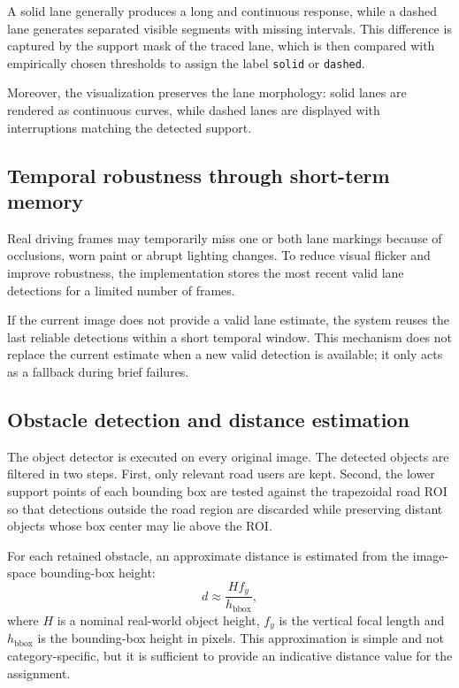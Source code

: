 \documentclass[conference]{IEEEtran}
\begin{document}
A solid lane generally produces a long and continuous response, while a dashed lane generates separated visible segments with missing intervals. This difference is captured by the support mask of the traced lane, which is then compared with empirically chosen thresholds to assign the label \texttt{solid} or \texttt{dashed}.

Moreover, the visualization preserves the lane morphology: solid lanes are rendered as continuous curves, while dashed lanes are displayed with interruptions matching the detected support.

\subsection{Temporal robustness through short-term memory}
Real driving frames may temporarily miss one or both lane markings because of occlusions, worn paint or abrupt lighting changes. To reduce visual flicker and improve robustness, the implementation stores the most recent valid lane detections for a limited number of frames.

If the current image does not provide a valid lane estimate, the system reuses the last reliable detections within a short temporal window. This mechanism does not replace the current estimate when a new valid detection is available; it only acts as a fallback during brief failures.

\subsection{Obstacle detection and distance estimation}
The object detector is executed on every original image. The detected objects are filtered in two steps. First, only relevant road users are kept. Second, the lower support points of each bounding box are tested against the trapezoidal road ROI so that detections outside the road region are discarded while preserving distant objects whose box center may lie above the ROI.

For each retained obstacle, an approximate distance is estimated from the image-space bounding-box height:
\begin{equation}
d \approx \frac{H f_y}{h_{\text{bbox}}},
\end{equation}
where $H$ is a nominal real-world object height, $f_y$ is the vertical focal length and $h_{\text{bbox}}$ is the bounding-box height in pixels. This approximation is simple and not category-specific, but it is sufficient to provide an indicative distance value for the assignment.
\end{document}
